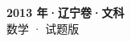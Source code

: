 \documentclass[zihao=-4, a4paper]{ctexart}
\begin{document}
\begin{center}
  {\Large\bfseries 2013 年·辽宁卷·文科}\\[4pt]
  {\large 数学 · 试题版}
\end{center}
\medskip
{}

\end{document}
